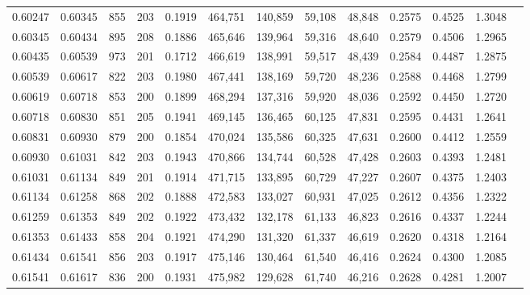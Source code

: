 \begin{tabular}{rrrrrrrrrrrrr}
0.60247 & 0.60345 &   855 & 203 &                                     0.1919 & 464,751 & 140,859 &  59,108 &  48,848 & 0.2575 & 0.4525 & 1.3048 \\
0.60345 & 0.60434 &   895 & 208 &                                     0.1886 & 465,646 & 139,964 &  59,316 &  48,640 & 0.2579 & 0.4506 & 1.2965 \\
0.60435 & 0.60539 &   973 & 201 &                                     0.1712 & 466,619 & 138,991 &  59,517 &  48,439 & 0.2584 & 0.4487 & 1.2875 \\
0.60539 & 0.60617 &   822 & 203 &                                     0.1980 & 467,441 & 138,169 &  59,720 &  48,236 & 0.2588 & 0.4468 & 1.2799 \\
0.60619 & 0.60718 &   853 & 200 &                                     0.1899 & 468,294 & 137,316 &  59,920 &  48,036 & 0.2592 & 0.4450 & 1.2720 \\
0.60718 & 0.60830 &   851 & 205 &                                     0.1941 & 469,145 & 136,465 &  60,125 &  47,831 & 0.2595 & 0.4431 & 1.2641 \\
0.60831 & 0.60930 &   879 & 200 &                                     0.1854 & 470,024 & 135,586 &  60,325 &  47,631 & 0.2600 & 0.4412 & 1.2559 \\
0.60930 & 0.61031 &   842 & 203 &                                     0.1943 & 470,866 & 134,744 &  60,528 &  47,428 & 0.2603 & 0.4393 & 1.2481 \\
0.61031 & 0.61134 &   849 & 201 &                                     0.1914 & 471,715 & 133,895 &  60,729 &  47,227 & 0.2607 & 0.4375 & 1.2403 \\
0.61134 & 0.61258 &   868 & 202 &                                     0.1888 & 472,583 & 133,027 &  60,931 &  47,025 & 0.2612 & 0.4356 & 1.2322 \\
0.61259 & 0.61353 &   849 & 202 &                                     0.1922 & 473,432 & 132,178 &  61,133 &  46,823 & 0.2616 & 0.4337 & 1.2244 \\
0.61353 & 0.61433 &   858 & 204 &                                     0.1921 & 474,290 & 131,320 &  61,337 &  46,619 & 0.2620 & 0.4318 & 1.2164 \\
0.61434 & 0.61541 &   856 & 203 &                                     0.1917 & 475,146 & 130,464 &  61,540 &  46,416 & 0.2624 & 0.4300 & 1.2085 \\
0.61541 & 0.61617 &   836 & 200 &                                     0.1931 & 475,982 & 129,628 &  61,740 &  46,216 & 0.2628 & 0.4281 & 1.2007 \\

\end{tabular}
